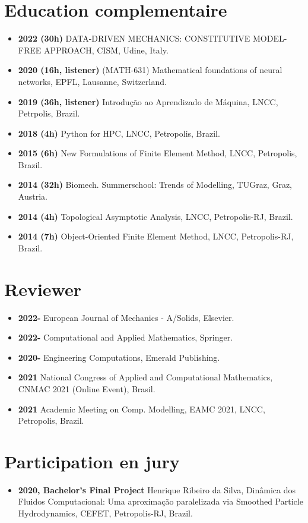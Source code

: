 \documentclass[french]{article}
\begin{document}
\section*{Education complementaire}
\begin{itemize}
\item \textbf{2022 (30h)} DATA-DRIVEN MECHANICS:
CONSTITUTIVE MODEL-FREE APPROACH, CISM, Udine, Italy.
\item \textbf{2020 (16h, listener)} (MATH-631) Mathematical foundations of neural networks, EPFL, Lausanne, Switzerland.
\item \textbf{2019 (36h, listener)} Introdução ao Aprendizado de Máquina, LNCC, Petrpolis, Brazil.
\item \textbf{2018 (4h)} Python for HPC, LNCC, Petropolis, Brazil.
\item \textbf{2015 (6h) } New Formulations of Finite Element Method, LNCC, Petropolis, Brazil.
\item \textbf{2014 (32h) } Biomech. Summerschool: Trends of Modelling, TUGraz, Graz, Austria.
\item \textbf{2014 (4h) } Topological Asymptotic Analysis, LNCC, Petropolis-RJ, Brazil. 
\item \textbf{2014 (7h) } Object-Oriented Finite Element Method, LNCC, Petropolis-RJ, Brazil.
\end{itemize}

\section*{Reviewer} 
\begin{itemize}
\item \textbf{2022-} European Journal of Mechanics - A/Solids, Elsevier.
\item \textbf{2022-} Computational and Applied Mathematics, Springer.
\item \textbf{2020-} Engineering Computations, Emerald Publishing.
\item \textbf{2021} National Congress of Applied and Computational Mathematics, CNMAC 2021 (Online Event), Brasil. 
\item \textbf{2021}  Academic Meeting on Comp. Modelling, EAMC 2021, LNCC, Petropolis, Brazil. \\

\end{itemize}

\section*{Participation en jury} 
\begin{itemize}
\item \textbf{2020, Bachelor's Final Project} Henrique Ribeiro da Silva, Dinâmica dos Fluidos Computacional: Uma aproximação paralelizada via Smoothed Particle Hydrodynamics, CEFET, Petropolis-RJ, Brazil.
\end{itemize}
\end{document}
